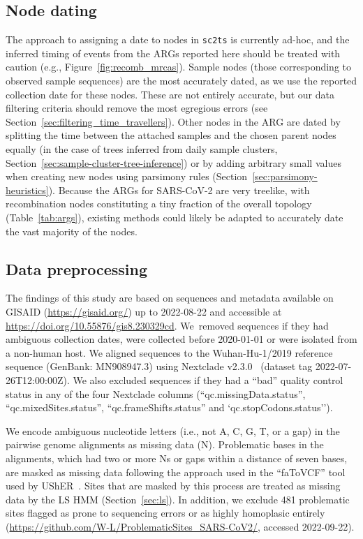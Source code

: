 \documentclass{article}
\begin{document}
\subsection{Node dating}
\label{sec:node_dating}
The approach to assigning a date to nodes in \texttt{sc2ts} is currently
ad-hoc, and the inferred timing of events from the ARGs reported
here should be treated with caution (e.g., Figure~\ref{fig:recomb_mrcas}).
Sample nodes (those corresponding to observed sample sequences) are the
most accurately dated, as we use the reported collection date for
these nodes. These are not entirely accurate, but our data filtering
criteria should remove the most egregious errors (see
Section~\ref{sec:filtering_time_travellers}). Other nodes in the ARG
are dated by splitting the time between the attached samples
and the chosen parent nodes equally (in the case of
trees inferred from daily sample clusters,
Section~\ref{sec:sample-cluster-tree-inference}) or by adding arbitrary
small values when creating new nodes using parsimony rules
(Section~\ref{sec:parsimony-heuristics}). Because the ARGs for SARS-CoV-2 are
very treelike, with recombination nodes constituting a tiny fraction
of the overall topology (Table~\ref{tab:args}), existing methods
\cite[e.g.,][]{to2016fast} could likely be adapted to accurately
date the vast majority of the nodes.

\subsection{Data preprocessing}
\label{sec:data_preprocessing}
The findings of this study are
based on sequences and metadata available on GISAID (\url{https://gisaid.org/})
up to 2022-08-22 and accessible at
\url{https://doi.org/10.55876/gis8.230329cd}.
We~removed sequences
if they had ambiguous collection dates, were collected before 2020-01-01
or were isolated from a non-human host.
We aligned sequences to the Wuhan-Hu-1/2019 reference sequence
(GenBank: MN908947.3) using Nextclade v2.3.0~\citep{Aksamentov2021-hj} (dataset tag
2022-07-26T12:00:00Z). We also excluded sequences if they had a
``bad'' quality control status
in any of the four Nextclade columns (``qc.missingData.status'',
``qc.mixedSites.status'', ``qc.frameShifts.status'' and `qc.stopCodons.status'').

We encode ambiguous nucleotide letters (i.e.,
not A, C, G, T, or a gap) in the pairwise genome alignments as missing data
(N). Problematic bases in the alignments, which had two or more Ns or
gaps within a distance of seven bases, are masked as missing data following
the approach used in the ``faToVCF'' tool used by
UShER~\citep{Turakhia2021-ur}.
Sites that are masked by this process are
treated as missing data by the LS HMM (Section~\ref{sec:ls}).
In addition, we exclude 481 problematic sites flagged as prone to
sequencing errors or as highly homoplasic entirely
(\url{https://github.com/W-L/ProblematicSites_SARS-CoV2/},
accessed 2022-09-22).
\end{document}
